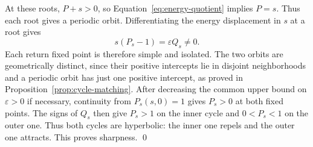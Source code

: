 At these roots, $P+s>0$, so
Equation~\eqref{eq:energy-quotient} implies $P=s$.
Thus each root gives a periodic orbit. Differentiating the energy
displacement in $s$ at a root gives
\[
 s(P_s-1)=\varepsilon Q_s\ne0.
\]
Each return fixed point is therefore simple and isolated. The
two orbits are geometrically distinct, since their positive
intercepts lie in disjoint neighborhoods and a periodic orbit
has just one positive intercept, as proved in
Proposition~\ref{prop:cycle-matching}. After decreasing the common
upper bound on $\varepsilon>0$ if necessary, continuity from
$P_s(s,0)=1$ gives $P_s>0$ at both fixed points. The signs of $Q_s$
then give $P_s>1$ on the inner cycle and $0<P_s<1$ on the outer one.
Thus both cycles are hyperbolic: the inner one repels and the outer
one attracts. This proves sharpness.
\qed
